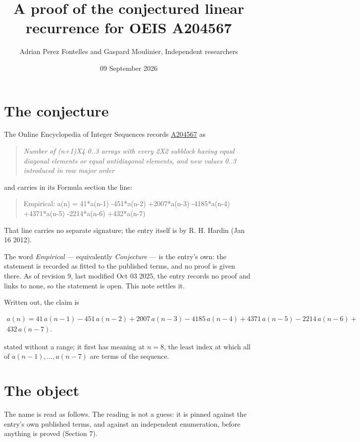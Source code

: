 \documentclass[11pt]{article}
\title{A proof of the conjectured linear recurrence for OEIS A204567}
\author{Adrian Perez Fontelles and Gaspard Moulinier, Independent researchers}
\date{09 September 2026}
\theoremstyle{definition}
\begin{document}
\maketitle
\section{The conjecture}

The Online Encyclopedia of Integer Sequences records \href{https://oeis.org/A204567}{A204567} as

\begin{quote}\itshape Number of (n+1)X4 0..3 arrays with every 2X2 subblock having equal diagonal elements or equal antidiagonal elements, and new values 0..3 introduced in row major order\end{quote}

and carries in its Formula section the line:

\begin{quote}\ttfamily Empirical: a(n) = 41*a(n-1) -451*a(n-2) +2007*a(n-3) -4185*a(n-4) +4371*a(n-5) -2214*a(n-6) +432*a(n-7)\end{quote}

That line carries no separate signature; the entry itself is by R. H. Hardin (Jan 16 2012).

The word {\itshape Empirical} --- equivalently {\itshape Conjecture} --- is the entry's own: the statement is recorded as fitted to the published terms, and no proof is given there. As of revision 9, last modified Oct 03 2025, the entry records no proof and links to none, so the statement is open. This note settles it.

Written out, the claim is

\begin{multline*} a(n) = 41\,a(n-1) - 451\,a(n-2) + 2007\,a(n-3) - 4185\,a(n-4) + 4371\,a(n-5) - 2214\,a(n-6) + \\ 432\,a(n-7). \end{multline*}

stated without a range; it first has meaning at $n = 8$, the least index at which all of $a(n-1),\dots,a(n-7)$ are terms of the sequence.

\section{The object}

The name is read as follows. The reading is not a guess: it is pinned against the entry's own published terms, and against an independent enumeration, before anything is proved (Section 7).
\end{document}
